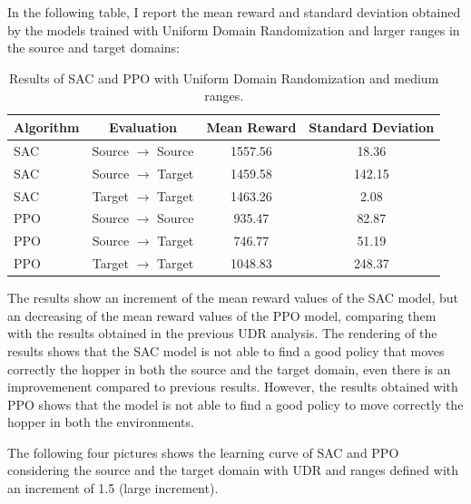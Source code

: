 \documentclass[11pt]{article}
\begin{document}
In the following table, I report the mean reward and standard deviation obtained by the models trained with Uniform Domain Randomization and larger ranges in the source and target domains:

\begin{table}[H]
    \centering
    \begin{tabular}{|l|c|c|c|}
        \hline
        \textbf{Algorithm} & \textbf{Evaluation} & \textbf{Mean Reward} & \textbf{Standard Deviation} \\ \hline
        SAC & Source $\rightarrow$ Source & 1557.56 & 18.36 \\ 
        SAC & Source $\rightarrow$ Target & 1459.58 & 142.15 \\ 
        SAC & Target $\rightarrow$ Target & 1463.26 & 2.08 \\ \hline
        PPO & Source $\rightarrow$ Source & 935.47 & 82.87 \\ 
        PPO & Source $\rightarrow$ Target & 746.77 & 51.19 \\ 
        PPO & Target $\rightarrow$ Target & 1048.83 & 248.37 \\ \hline
    \end{tabular}
    \caption{Results of SAC and PPO with Uniform Domain Randomization and medium ranges.}
    \label{tab:results_udr_medium}
\end{table}

The results show an increment of the mean reward values of the SAC model, but an decreasing of the mean reward values of the PPO model, comparing them with the results obtained in the previous UDR analysis. The rendering of the results shows that the SAC model is not able to find a good policy that moves correctly the hopper in both the source and the target domain, even there is an improvemenent compared to previous results. However, the results obtained with PPO shows that the model is not able to find a good policy to move correctly the hopper in both the environments. 

The following four pictures shows the learning curve of SAC and PPO considering the source and the target domain with UDR and ranges defined with an increment of 1.5 (large increment).
\end{document}
